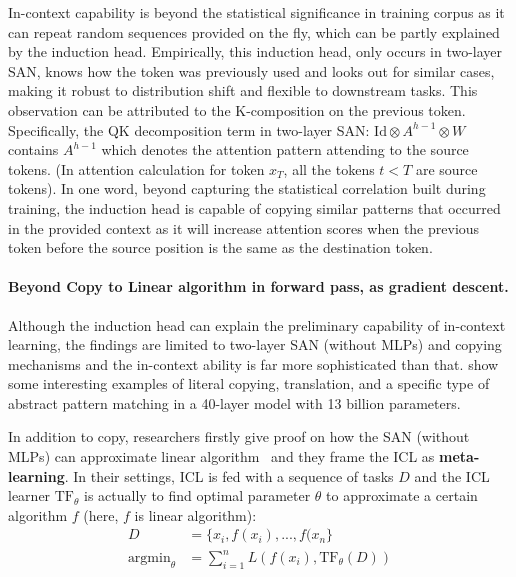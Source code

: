In-context capability is beyond the statistical significance in training corpus as it can repeat random sequences provided on the fly, which can be partly explained by the induction head. Empirically, this induction head, only occurs in two-layer SAN, knows how the token was previously used and looks out for similar cases, making it robust to distribution shift and flexible to downstream tasks. This observation can be attributed to the K-composition on the previous token. Specifically, the QK decomposition term in two-layer SAN: $\text{Id}\otimes A^{h-1}\otimes W$ contains $A^{h-1}$ which denotes the attention pattern attending to the source tokens. (In attention calculation for token $x_T$, all the tokens $t<T$ are source tokens). In one word, beyond capturing the statistical correlation built during training, the induction head is capable of copying similar patterns that occurred in the provided context as it will increase attention scores when the previous token before the source position is the same as the destination token.

\paragraph{Beyond Copy to Linear algorithm in forward pass, as gradient descent.}
Although the induction head can explain the preliminary capability of in-context learning, the findings are limited to two-layer SAN (without MLPs) and copying mechanisms and the in-context ability is far more sophisticated than that\citet{olsson2022context}. \citet{olsson2022context} show some interesting examples of literal copying, translation, and a specific type of abstract pattern matching in a 40-layer model with 13 billion parameters. 

In addition to copy, researchers firstly give proof on how the SAN (without MLPs) can approximate linear algorithm~\cite{dai2023can,DBLP:conf/iclr/AkyurekSA0Z23} and they frame the ICL as \textbf{meta-learning}. In their settings, ICL is fed with a sequence of tasks $D$ and the ICL learner $\text{TF}_{\theta}$ is actually to find optimal parameter $\theta$ to approximate a certain algorithm $f$ (here, $f$ is linear algorithm): 
\begin{align*}
   D &=  \{x_i,f(x_{i}),...,f(x_{n}\}\\
\text{argmin}_{\theta} &= \sum_{i=1}^{n} L(f(x_{i}),\text{TF}_{\theta}(D))
\end{align*}


